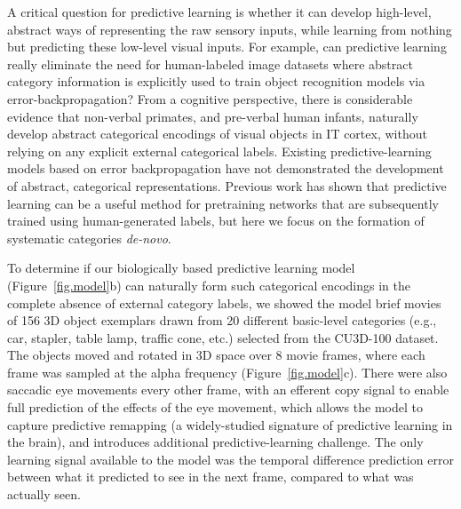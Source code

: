 \documentclass[12pt,twoside]{naturefigs}  %
\newif\myifpdf
\begin{document}
A critical question for predictive learning is whether it can develop high-level, abstract ways of representing the raw sensory inputs, while learning from nothing but predicting these low-level visual inputs.  For example, can predictive learning really eliminate the need for human-labeled image datasets where abstract category information is explicitly used to train object recognition models via error-backpropagation?  From a cognitive perspective, there is considerable evidence that non-verbal primates, and pre-verbal human infants, naturally develop abstract categorical encodings of visual objects in IT cortex\cite{CadieuHongYaminsEtAl14}, without relying on any explicit external categorical labels.  Existing predictive-learning models based on error backpropagation\cite{LotterKreimanCox16} have not demonstrated the development of abstract, categorical representations.  Previous work has shown that predictive learning can be a useful method for pretraining networks that are subsequently trained using human-generated labels, but here we focus on the formation of systematic categories {\em de-novo}.


To determine if our biologically based predictive learning model (Figure~\ref{fig.model}b) can naturally form such categorical encodings in the complete absence of external category labels, we showed the model brief movies of 156 3D object exemplars drawn from 20 different basic-level categories (e.g., car, stapler, table lamp, traffic cone, etc.) selected from the CU3D-100 dataset\cite{OReillyWyatteHerdEtAl13}.  The objects moved and rotated in 3D space over 8 movie frames, where each frame was sampled at the alpha frequency (Figure~\ref{fig.model}c).  There were also saccadic eye movements every other frame, with an efferent copy signal to enable full prediction of the effects of the eye movement, which allows the model to capture predictive remapping (a widely-studied signature of predictive learning in the brain)\cite{DuhamelColbyGoldberg92,CavanaghHuntAfrazEtAl10}, and introduces additional predictive-learning challenge.  The only learning signal available to the model was the temporal difference prediction error between what it predicted to see in the next frame, compared to what was actually seen.  
\end{document}
